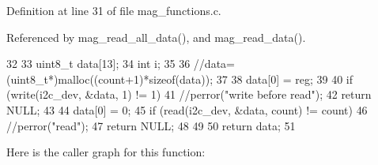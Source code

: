 Definition at line 31 of file mag\_\-functions.c.



Referenced by mag\_\-read\_\-all\_\-data(), and mag\_\-read\_\-data().




\begin{DoxyCode}
32 {
33   uint8_t data[13];
34   int i;
35 
36   //data=(uint8_t*)malloc((count+1)*sizeof(data));
37   
38   data[0] = reg;
39 
40   if (write(i2c_dev, &data, 1) != 1) {           
41         //perror("write before read");
42         return NULL;
43   }
44   data[0] = 0;
45   if (read(i2c_dev, &data, count) != count) {
46         //perror("read");
47         return NULL;    
48   }
49 
50   return data;
51 }
\end{DoxyCode}




Here is the caller graph for this function:

